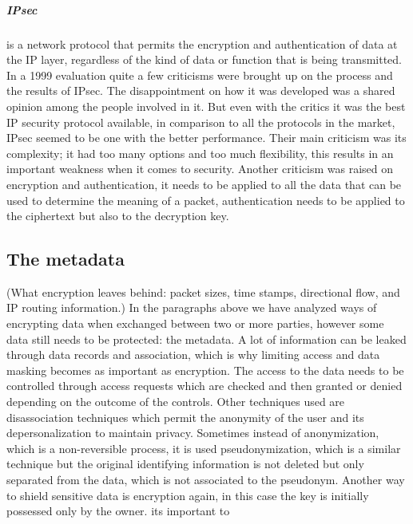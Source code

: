 \subparagraph{IPsec} is a network protocol that permits the encryption and authentication of
data at the IP layer, regardless of the kind of data or function that is being transmitted. 
In a 1999 evaluation \cite{ferguson1999cryptographic} quite a few criticisms were brought up on the 
process and the results of IPsec. The disappointment on how it was developed was a shared opinion among
the people involved in it. But even with the critics it was the best IP security protocol available, 
in comparison to all the protocols in the market, IPsec seemed to be one with the better performance. 
Their main criticism was its complexity; it had too many options and too much flexibility, this results 
in an important weakness when it comes to security. Another criticism was raised on encryption and authentication,
it needs to be applied to all the data that can be used to determine the meaning of a packet, 
authentication needs to be applied to the ciphertext but also to the decryption key. 


\subsection{The metadata}
(What encryption leaves behind: packet sizes, time stamps, directional flow, and IP routing information.)
In the paragraphs above we have analyzed ways of encrypting data when exchanged between two or more parties, 
however some data still needs to be protected: the metadata. A lot of information can be leaked through 
data records and association, which is why limiting access and data masking becomes as important as encryption. 
The access to the data needs to be controlled through access requests which are checked and then granted or denied 
depending on the outcome of the controls. Other techniques used are disassociation techniques which permit the anonymity 
of the user and its depersonalization to maintain privacy. Sometimes instead of anonymization, which is a non-reversible process, 
it is used pseudonymization, which is a similar technique but the original identifying information is not deleted but only 
separated from the data, which is not associated to the pseudonym. Another way to shield sensitive data is encryption again, 
in this case the key is initially possessed only by the owner. \cite{6149189}
its important to

